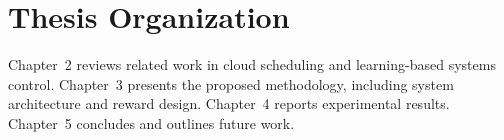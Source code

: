 \section{Thesis Organization}
Chapter~2 reviews related work in cloud scheduling and learning-based
systems control. Chapter~3 presents the proposed methodology, including
system architecture and reward design. Chapter~4 reports experimental
results. Chapter~5 concludes and outlines future work.
